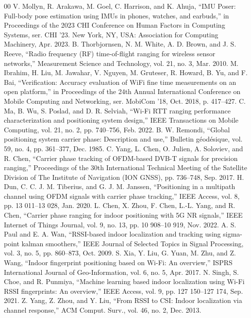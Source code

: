 \documentclass[journal]{IEEEtran}
\begin{document}
\begin{thebibliography}{00}
 V. Mollyn, R. Arakawa, M. Goel, C. Harrison, and K. Ahuja, “IMU Poser: Full-body pose estimation using IMUs in phones, watches, and earbuds,” in Proceedings of the 2023 CHI Conference on Human Factors in Computing Systems, ser. CHI ’23. New York, NY, USA: Association for Computing Machinery, Apr. 2023.
 B. Thorbjornsen, N. M. White, A. D. Brown, and J. S. Reeve, “Radio frequency (RF) time-of-flight ranging for wireless sensor networks,” Measurement Science and Technology, vol. 21, no. 3, Mar. 2010.
 M. Ibrahim, H. Liu, M. Jawahar, V. Nguyen, M. Gruteser, R. Howard, B. Yu, and F. Bai, “Verification: Accuracy evaluation of WiFi fine time measurements on an open platform,” in Proceedings of the 24th Annual International Conference on Mobile Computing and Networking, ser. MobiCom ’18, Oct. 2018, p. 417–427.
 C. Ma, B. Wu, S. Poslad, and D. R. Selviah, “Wi-Fi RTT ranging performance characterization and positioning system design,” IEEE Transactions on Mobile Computing, vol. 21, no. 2, pp. 740–756, Feb. 2022.
 B. W. Remondi, “Global positioning system carrier phase: Description and use,” Bulletin g\'eod\'esique, vol. 59, no. 4, pp. 361–377, Dec. 1985.
 C. Yang, L. Chen, O. Julien, A. Soloviev, and R. Chen, “Carrier phase tracking of OFDM-based DVB-T signals for precision ranging,” Proceedings of the 30th International Technical Meeting of the Satellite Division of The Institute of Navigation (ION GNSS), pp. 736–748, Sep. 2017.
 H. Dun, C. C. J. M. Tiberius, and G. J. M. Janssen, “Positioning in a multipath channel using OFDM signals with carrier phase tracking,” IEEE Access, vol. 8, pp. 13 011–13 028, Jan. 2020.
 L. Chen, X. Zhou, F. Chen, L.-L. Yang, and R. Chen, “Carrier phase ranging for indoor positioning with 5G NR signals,” IEEE Internet of Things Journal, vol. 9, no. 13, pp. 10 908–10 919, Nov. 2022.
 A. S. Paul and E. A. Wan, “RSSI-based indoor localization and tracking using sigma-point kalman smoothers,” IEEE Journal of Selected Topics in Signal Processing, vol. 3, no. 5, pp. 860–873, Oct. 2009.
 S. Xia, Y. Liu, G. Yuan, M. Zhu, and Z. Wang, “Indoor fingerprint positioning based on Wi-Fi: An overview,” ISPRS International Journal of Geo-Information, vol. 6, no. 5, Apr. 2017.
 N. Singh, S. Choe, and R. Punmiya, “Machine learning based indoor localization using Wi-Fi RSSI fingerprints: An overview,” IEEE Access, vol. 9, pp. 127 150–127 174, Sep. 2021.
 Z. Yang, Z. Zhou, and Y. Liu, “From RSSI to CSI: Indoor localization via channel response,” ACM Comput. Surv., vol. 46, no. 2, Dec. 2013.

\end{thebibliography}
\end{document}
